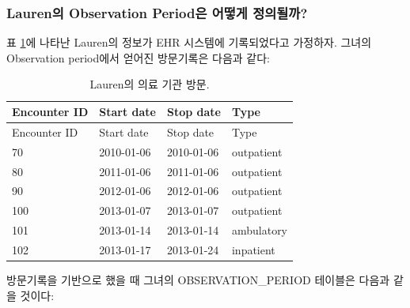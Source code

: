 \documentclass[11pt]{book}
\theoremstyle{definition}
\theoremstyle{definition}
\theoremstyle{definition}
\theoremstyle{remark}
\begin{document}
\subsubsection*{Lauren의 Observation Period은 어떻게
정의될까?}\label{lauren-observation-period--}

표 \ref{tab:encounters}에 나타난 Lauren의 정보가 EHR 시스템에
기록되었다고 가정하자. 그녀의 Observation period에서 얻어진 방문기록은
다음과 같다:

\begin{longtable}[]{@{}llll@{}}
\caption{\label{tab:encounters} Lauren의 의료 기관 방문.}\tabularnewline
\toprule
Encounter ID & Start date & Stop date & Type\tabularnewline
\midrule
\endfirsthead
\toprule
Encounter ID & Start date & Stop date & Type\tabularnewline
\midrule
\endhead
70 & 2010-01-06 & 2010-01-06 & outpatient\tabularnewline
80 & 2011-01-06 & 2011-01-06 & outpatient\tabularnewline
90 & 2012-01-06 & 2012-01-06 & outpatient\tabularnewline
100 & 2013-01-07 & 2013-01-07 & outpatient\tabularnewline
101 & 2013-01-14 & 2013-01-14 & ambulatory\tabularnewline
102 & 2013-01-17 & 2013-01-24 & inpatient\tabularnewline
\bottomrule
\end{longtable}

방문기록을 기반으로 했을 때 그녀의 OBSERVATION\_PERIOD 테이블은 다음과
같을 것이다:
\end{document}
